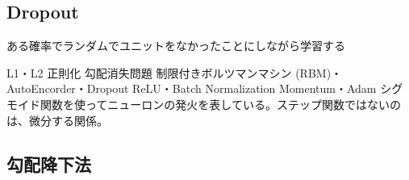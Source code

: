 \documentclass{jsarticle}
\begin{document}
\subsection{Dropout}
ある確率でランダムでユニットをなかったことにしながら学習する





L1・L2 正則化
勾配消失問題
制限付きボルツマンマシン (RBM)・AutoEncorder・Dropout
ReLU・Batch Normalization
Momentum・Adam
シグモイド関数を使ってニューロンの発火を表している。ステップ関数ではないのは、微分する関係。
\subsection{勾配降下法}


\section{}
\section{}
\section{}
\section{}
\section{}
\section{}
\section{}
\section{}
\section{}
\end{document}
